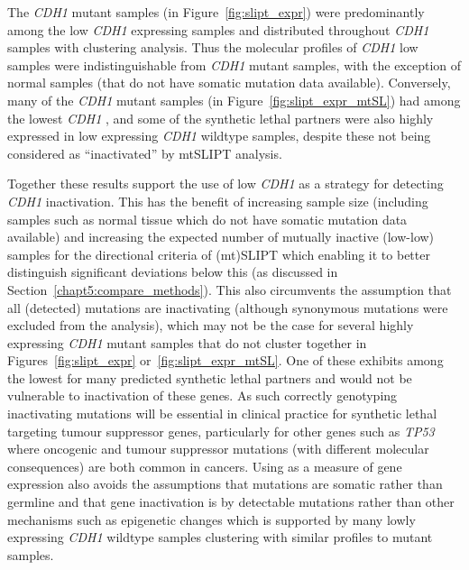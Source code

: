 \FloatBarrier

The \textit{CDH1} \gls{mutant} samples (in Figure~\ref{fig:slipt_expr}) were predominantly among the low \textit{CDH1} expressing samples and distributed throughout \textit{CDH1} samples with clustering analysis. Thus the molecular profiles of \textit{CDH1} low samples were indistinguishable from \textit{CDH1} \gls{mutant} samples, with the exception of normal samples (that do not have \gls{somatic} \gls{mutation} data available). Conversely, many of the \textit{CDH1} \gls{mutant} samples (in Figure~\ref{fig:slipt_expr_mtSL}) had among the lowest \textit{CDH1} , and some of the \gls{synthetic lethal} partners were also highly expressed in low expressing \textit{CDH1} wildtype samples, despite these not being considered as ``inactivated'' by \acrshort{mtSLIPT} analysis.

Together these results support the use of low \textit{CDH1}  as a strategy for detecting \textit{CDH1} inactivation. This has the benefit of increasing sample size (including samples such as normal tissue which do not have \gls{somatic} \gls{mutation} data available) and increasing the expected number of mutually inactive (low-low) samples for the directional criteria of (mt)SLIPT which enabling it to better distinguish significant deviations below this (as discussed in Section~\ref{chapt5:compare_methods}). This also circumvents the assumption that all (detected) \glspl{mutation} are inactivating (although synonymous \glspl{mutation} were excluded from the analysis), which may not be the case for several highly expressing \textit{CDH1} \gls{mutant} samples that do not cluster together in Figures~\ref{fig:slipt_expr} or~\ref{fig:slipt_expr_mtSL}. One of these exhibits among the lowest  for many predicted \gls{synthetic lethal} partners and would not be vulnerable to inactivation of these genes. As such correctly genotyping inactivating \glspl{mutation} will be \gls{essential} in clinical practice for \gls{synthetic lethal} targeting \gls{tumour suppressor} genes, particularly for other genes such as \textit{TP53} where oncogenic and \gls{tumour suppressor} \glspl{mutation} (with different molecular consequences) are both common in cancers. Using  as a measure of \gls{gene expression} also avoids the assumptions that \glspl{mutation} are \gls{somatic} rather than \gls{germline} and that gene inactivation is by detectable \glspl{mutation} rather than other mechanisms such as epigenetic changes which is supported by many lowly expressing \textit{CDH1} wildtype samples clustering with similar profiles to \gls{mutant} samples.

